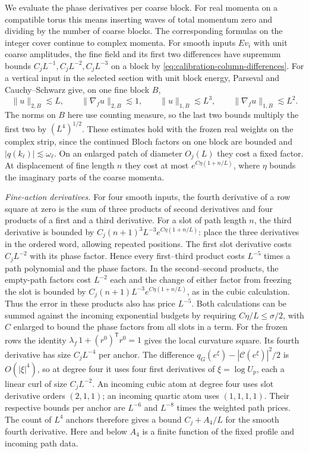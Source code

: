 \documentclass[11pt,reqno]{amsart}
\numberwithin{equation}{section}
\theoremstyle{definition}
\theoremstyle{remark}
\begin{document}
We evaluate the phase derivatives per coarse block. For real
momenta on a compatible torus this means inserting waves of
total momentum zero and dividing by the number of coarse blocks.
The corresponding formulas on the integer cover continue to
complex momenta. For smooth inputs \(Ev_i\) with unit coarse
amplitudes, the fine field and its first two differences have
supremum bounds \(C_jL^{-1},C_jL^{-2},C_jL^{-3}\) on a block by
\eqref{eq:calibration-column-differences}. For a vertical
input in the selected section with unit block energy, Parseval
and Cauchy--Schwarz give, on one fine block \(B\),
\begin{equation}
 \|u\|_{2,B}\lesssim L,\qquad
 \|\nabla_f u\|_{2,B}\lesssim1,\qquad
 \|u\|_{1,B}\lesssim L^3,\qquad
 \|\nabla_f u\|_{1,B}\lesssim L^2 .
 \label{eq:quartic-block-counting}
\end{equation}
The norms on \(B\) here use counting measure, so the last two
bounds multiply the first two by \((L^4)^{1/2}\).
These estimates hold with the frozen real weights on the
complex strip, since the continued Bloch factors on one block
are bounded and \(|q(k_\ell)|\lesssim\omega_\ell\).
On an enlarged patch of diameter \(O_j(L)\) they cost a fixed
factor. At displacement of fine length \(n\) they cost at most
\(e^{C\eta(1+n/L)}\), where \(\eta\) bounds the imaginary
parts of the coarse momenta.

\smallskip\noindent
\emph{Fine-action derivatives.}
For four smooth inputs, the fourth derivative of a row square
at zero is the sum of three products of second derivatives
and four products of a first and a third derivative.
For a slot of path length \(n\), the third derivative is bounded
by \(C_j(n+1)^3L^{-3}e^{C\eta(1+n/L)}\): place the three
derivatives in the ordered word, allowing repeated positions.
The first slot derivative costs \(C_jL^{-2}\) with its phase
factor. Hence every first--third product costs \(L^{-5}\)
times a path polynomial and the phase factors. In the
second--second products, the empty-path factors cost \(L^{-2}\)
each and the change of either factor from freezing the slot is
bounded by \(C_j(n+1)L^{-3}e^{C\eta(1+n/L)}\), as in the
cubic calculation. Thus the error in these products also has
price \(L^{-5}\). Both calculations can be summed against the
incoming exponential budgets by requiring \(C\eta/L\le\sigma/2\),
with \(C\) enlarged to bound the phase factors from all slots
in a term. For the frozen rows the identity
\(\lambda_f\,1+(r^0)^{\mathsf T}r^0=1\) gives the local
curvature square. Its fourth derivative has size \(C_jL^{-4}\)
per anchor. The difference
\(q_G(e^\xi)-|\mathcal C(e^\xi)|^2/2\) is \(O(|\xi|^4)\),
so at degree four it uses four first derivatives of
\(\xi=\log U_p\), each a linear curl of size \(C_jL^{-2}\).
An incoming cubic atom at degree four uses slot derivative
orders \((2,1,1)\); an incoming quartic atom uses
\((1,1,1,1)\). Their respective bounds per anchor are
\(L^{-6}\) and \(L^{-8}\) times the weighted path prices.
The count of \(L^4\) anchors therefore gives a bound
\(C_j+A_4/L\) for the smooth fourth derivative. Here and
below \(A_4\) is a finite function of the fixed profile and
incoming path data.
\end{document}
